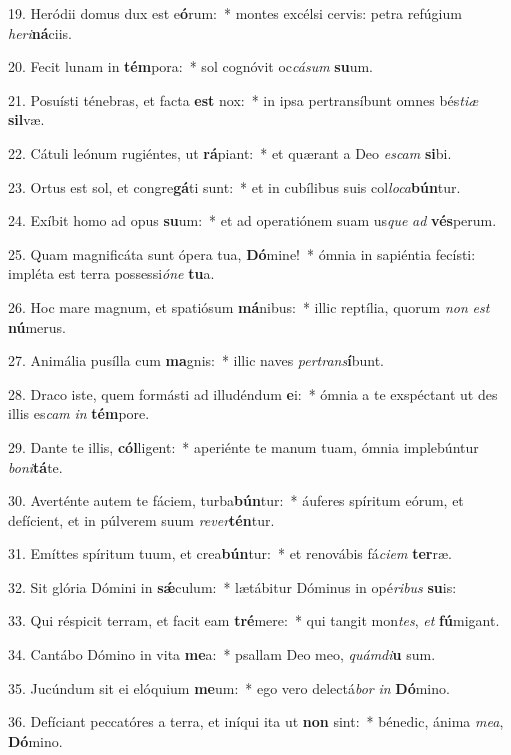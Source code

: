 19. Heródii domus dux est e\textbf{ó}rum:~*  montes excélsi cervis: petra refúgium \textit{he}\textit{ri}\textbf{ná}ciis.\

20. Fecit lunam in \textbf{tém}pora:~*  sol cognóvit oc\textit{cá}\textit{sum} \textbf{su}um.\

21. Posuísti ténebras, et facta \textbf{est} nox:~*  in ipsa pertransíbunt omnes bés\textit{ti}\textit{æ} \textbf{sil}væ.\

22. Cátuli leónum rugiéntes, ut \textbf{rá}piant:~*  et quærant a Deo \textit{es}\textit{cam} \textbf{si}bi.\

23. Ortus est sol, et congre\textbf{gá}ti sunt:~*  et in cubílibus suis col\textit{lo}\textit{ca}\textbf{bún}tur.\

24. Exíbit homo ad opus \textbf{su}um:~*  et ad operatiónem suam us\textit{que} \textit{ad} \textbf{vés}perum.\

25. Quam magnificáta sunt ópera tua, \textbf{Dó}mine!~*  ómnia in sapiéntia fecísti: impléta est terra possessi\textit{ó}\textit{ne} \textbf{tu}a.\

26. Hoc mare magnum, et spatiósum \textbf{má}nibus:~*  illic reptília, quorum \textit{non} \textit{est} \textbf{nú}merus.\

27. Animália pusílla cum \textbf{ma}gnis:~*  illic naves \textit{per}\textit{trans}\textbf{í}bunt.\

28. Draco iste, quem formásti ad illudéndum \textbf{e}i:~*  ómnia a te exspéctant ut des illis es\textit{cam} \textit{in} \textbf{tém}pore.\

29. Dante te illis, \textbf{cól}ligent:~*  aperiénte te manum tuam, ómnia implebúntur \textit{bo}\textit{ni}\textbf{tá}te.\

30. Averténte autem te fáciem, turba\textbf{bún}tur:~*  áuferes spíritum eórum, et defícient, et in púlverem suum \textit{re}\textit{ver}\textbf{tén}tur.\

31. Emíttes spíritum tuum, et crea\textbf{bún}tur:~*  et renovábis fá\textit{ci}\textit{em} \textbf{ter}ræ.\

32. Sit glória Dómini in \textbf{sǽ}culum:~*  lætábitur Dóminus in opé\textit{ri}\textit{bus} \textbf{su}is:\

33. Qui réspicit terram, et facit eam \textbf{tré}mere:~*  qui tangit mon\textit{tes}, \textit{et} \textbf{fú}migant.\

34. Cantábo Dómino in vita \textbf{me}a:~*  psallam Deo meo, \textit{quám}\textit{di}\textbf{u} sum.\

35. Jucúndum sit ei elóquium \textbf{me}um:~*  ego vero delectá\textit{bor} \textit{in} \textbf{Dó}mino.\

36. Defíciant peccatóres a terra, et iníqui ita ut \textbf{non} sint:~*  bénedic, ánima \textit{me}\textit{a}, \textbf{Dó}mino.\

